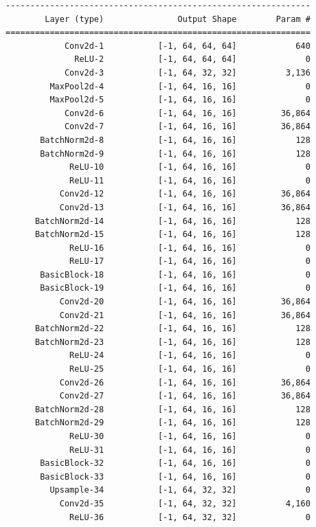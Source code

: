 \documentclass{bmvc2k}
\begin{document}
\begin{verbatim}
--------------------------------------------------------------
        Layer (type)               Output Shape        Param #
==============================================================
            Conv2d-1           [-1, 64, 64, 64]            640
              ReLU-2           [-1, 64, 64, 64]              0
            Conv2d-3           [-1, 64, 32, 32]          3,136
         MaxPool2d-4           [-1, 64, 16, 16]              0
         MaxPool2d-5           [-1, 64, 16, 16]              0
            Conv2d-6           [-1, 64, 16, 16]         36,864
            Conv2d-7           [-1, 64, 16, 16]         36,864
       BatchNorm2d-8           [-1, 64, 16, 16]            128
       BatchNorm2d-9           [-1, 64, 16, 16]            128
             ReLU-10           [-1, 64, 16, 16]              0
             ReLU-11           [-1, 64, 16, 16]              0
           Conv2d-12           [-1, 64, 16, 16]         36,864
           Conv2d-13           [-1, 64, 16, 16]         36,864
      BatchNorm2d-14           [-1, 64, 16, 16]            128
      BatchNorm2d-15           [-1, 64, 16, 16]            128
             ReLU-16           [-1, 64, 16, 16]              0
             ReLU-17           [-1, 64, 16, 16]              0
       BasicBlock-18           [-1, 64, 16, 16]              0
       BasicBlock-19           [-1, 64, 16, 16]              0
           Conv2d-20           [-1, 64, 16, 16]         36,864
           Conv2d-21           [-1, 64, 16, 16]         36,864
      BatchNorm2d-22           [-1, 64, 16, 16]            128
      BatchNorm2d-23           [-1, 64, 16, 16]            128
             ReLU-24           [-1, 64, 16, 16]              0
             ReLU-25           [-1, 64, 16, 16]              0
           Conv2d-26           [-1, 64, 16, 16]         36,864
           Conv2d-27           [-1, 64, 16, 16]         36,864
      BatchNorm2d-28           [-1, 64, 16, 16]            128
      BatchNorm2d-29           [-1, 64, 16, 16]            128
             ReLU-30           [-1, 64, 16, 16]              0
             ReLU-31           [-1, 64, 16, 16]              0
       BasicBlock-32           [-1, 64, 16, 16]              0
       BasicBlock-33           [-1, 64, 16, 16]              0
         Upsample-34           [-1, 64, 32, 32]              0
           Conv2d-35           [-1, 64, 32, 32]          4,160
             ReLU-36           [-1, 64, 32, 32]              0

\end{verbatim}
\end{document}
